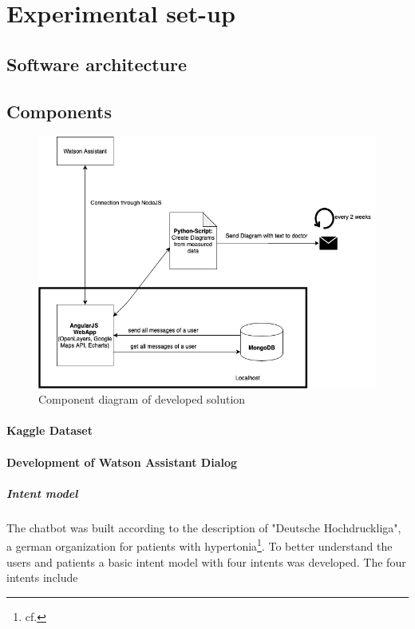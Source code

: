 \section{Experimental set-up}

\subsection{Software architecture}

\subsection{Components}
\begin{figure}[htbp]
	\centering
	\includegraphics[width=1\textwidth]{images/components.png}
	\caption{Component diagram of developed solution}
	\label{ncbi_query}
\end{figure}

\paragraph{Kaggle Dataset}
\paragraph{Development of Watson Assistant Dialog}

\subparagraph{Intent model}

The chatbot was built according to the description of "Deutsche Hochdruckliga", a german organization for patients with hypertonia\footnote{cf.\autocite{hochdruckliga}}.
To better understand the users and patients a basic intent model with four intents was developed. 
The four intents include 

